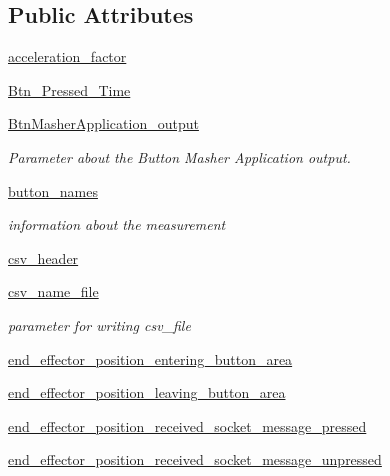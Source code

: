 \subsection*{Public Attributes}
\begin{DoxyCompactItemize}
\item 
\hyperlink{classRET__Parameter_1_1RET__Parameter_abd224cfc80b136898df89af7812fa8d5}{acceleration\+\_\+factor}
\item 
\hyperlink{classRET__Parameter_1_1RET__Parameter_a39e93ce131ad25f98c5ce27c3ab36a6e}{Btn\+\_\+\+Pressed\+\_\+\+Time}
\item 
\hyperlink{classRET__Parameter_1_1RET__Parameter_a2b7700878675832931a1182c86c13de3}{Btn\+Masher\+Application\+\_\+output}
\begin{DoxyCompactList}\small\item\em Parameter about the Button Masher Application output. \end{DoxyCompactList}\item 
\hyperlink{classRET__Parameter_1_1RET__Parameter_a62209bbfef695c79e2e4a3c58cde6904}{button\+\_\+names}
\begin{DoxyCompactList}\small\item\em information about the measurement \end{DoxyCompactList}\item 
\hyperlink{classRET__Parameter_1_1RET__Parameter_a6a998519b5c6ea893e0afee65eccbf93}{csv\+\_\+header}
\item 
\hyperlink{classRET__Parameter_1_1RET__Parameter_a195beb1936a2c54c9c5b84ee44779c23}{csv\+\_\+name\+\_\+file}
\begin{DoxyCompactList}\small\item\em parameter for writing csv\+\_\+file \end{DoxyCompactList}\item 
\hyperlink{classRET__Parameter_1_1RET__Parameter_ac1a9a183848e43cc95622a427a79fffe}{end\+\_\+effector\+\_\+position\+\_\+entering\+\_\+button\+\_\+area}
\item 
\hyperlink{classRET__Parameter_1_1RET__Parameter_a9c8c6317198ca7fcf65796f882f5c428}{end\+\_\+effector\+\_\+position\+\_\+leaving\+\_\+button\+\_\+area}
\item 
\hyperlink{classRET__Parameter_1_1RET__Parameter_a1e5d03d6109af678189c173702b43d8a}{end\+\_\+effector\+\_\+position\+\_\+received\+\_\+socket\+\_\+message\+\_\+pressed}
\item 
\hyperlink{classRET__Parameter_1_1RET__Parameter_ad93d89da4eaf9aa21460b563818858da}{end\+\_\+effector\+\_\+position\+\_\+received\+\_\+socket\+\_\+message\+\_\+unpressed}

\end{DoxyCompactItemize}
